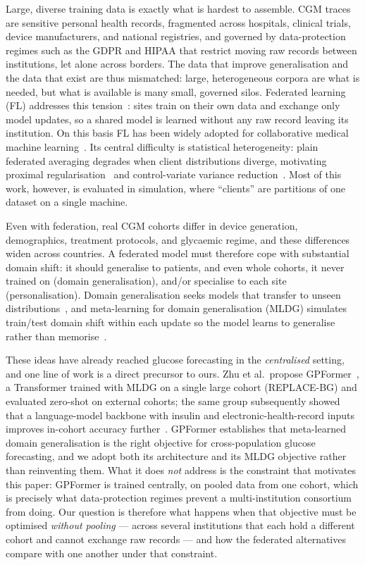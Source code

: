 \documentclass[10pt,letterpaper]{article}
\begin{document}
Large, diverse training data is exactly what is hardest to assemble. CGM traces
are sensitive personal health records, fragmented across hospitals, clinical
trials, device manufacturers, and national registries, and governed by
data-protection regimes such as the GDPR and HIPAA that restrict moving raw
records between institutions, let alone across borders. The data that improve
generalisation and the data that exist are thus mismatched: large, heterogeneous
corpora are what is needed, but what is available is many small, governed silos.
Federated learning (FL) addresses this tension~\cite{mcmahan2017fedavg}: sites
train on their own data and exchange only model updates, so a shared model is
learned without any raw record leaving its institution. On this basis FL has been
widely adopted for collaborative medical machine
learning~\cite{rieke2020future,sheller2020federated,kaissis2020secure}. Its
central difficulty is statistical heterogeneity: plain federated averaging
degrades when client distributions diverge, motivating proximal
regularisation~\cite{li2020fedprox} and control-variate variance
reduction~\cite{karimireddy2020scaffold}. Most of this work, however, is evaluated
in simulation, where ``clients'' are partitions of one dataset on a single
machine.

Even with federation, real CGM cohorts differ in device generation, demographics,
treatment protocols, and glycaemic regime, and these differences widen across
countries. A federated model must therefore cope with substantial domain shift: it
should generalise to patients, and even whole cohorts, it never trained on (domain
generalisation), and/or specialise to each site (personalisation). Domain
generalisation seeks models that transfer to unseen
distributions~\cite{zhou2022dgsurvey}, and meta-learning for domain generalisation
(MLDG) simulates train/test domain shift within each update so the model learns to
generalise rather than memorise~\cite{li2018mldg}.

These ideas have already reached glucose forecasting in the \emph{centralised}
setting, and one line of work is a direct precursor to ours. Zhu et al.\ propose
GPFormer~\cite{zhu2024gpformer}, a Transformer trained with MLDG on a single large
cohort (REPLACE-BG) and evaluated zero-shot on external cohorts; the same group
subsequently showed that a language-model backbone with insulin and
electronic-health-record inputs improves in-cohort accuracy
further~\cite{zhu2026glullm}. GPFormer establishes that meta-learned domain
generalisation is the right objective for cross-population glucose forecasting,
and we adopt both its architecture and its MLDG objective rather than reinventing
them. What it does \emph{not} address is the constraint that motivates this
paper: GPFormer is trained centrally, on pooled data from one cohort, which is
precisely what data-protection regimes prevent a multi-institution consortium
from doing. Our question is therefore what happens when that objective must be
optimised \emph{without pooling} --- across several institutions that each hold a
different cohort and cannot exchange raw records --- and how the federated
alternatives compare with one another under that constraint.
\end{document}
